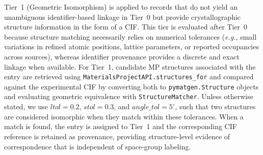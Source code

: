\documentclass[a4paper,fleqn]{cas-sc}
\begin{document}

Tier~1 (Geometric Isomorphism) is applied to records that do not yield an unambiguous identifier-based linkage in Tier~0 but provide crystallographic structure information in the form of a CIF. This tier is evaluated after Tier~0 because structure matching necessarily relies on numerical tolerances (\textit{e.g.}, small variations in refined atomic positions, lattice parameters, or reported occupancies across sources), whereas identifier provenance provides a discrete and exact linkage when available. For Tier~1, candidate MP structures associated with the entry are retrieved using \texttt{MaterialsProjectAPI.structures\_for} and compared against the experimental CIF by converting both to \texttt{pymatgen.Structure} objects and evaluating geometric equivalence with \texttt{StructureMatcher}. Unless otherwise stated, we use $ltol=0.2$, $stol=0.3$, and $angle\_tol=5^{\circ}$, such that two structures are considered isomorphic when they match within these tolerances. When a match is found, the entry is assigned to Tier~1 and the corresponding CIF reference is retained as provenance, providing structure-level evidence of correspondence that is independent of space-group labeling.

\end{document}
